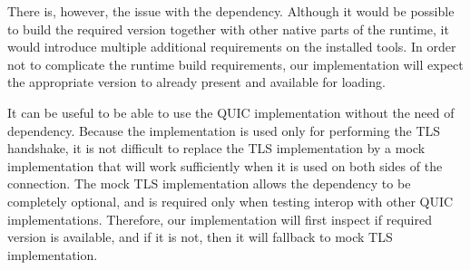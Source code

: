 There is, however, the issue with the \libopenssl{} dependency. Although it would be possible to
build the required \libopenssl{} version together with other native parts of the \dotnet{} runtime,
it would introduce multiple additional requirements on the installed tools. In order not to
complicate the runtime build requirements, our implementation will expect the appropriate
\libopenssl{} version to already present and available for loading.

It can be useful to be able to use the QUIC implementation without the need of \libopenssl{}
dependency. Because the \libopenssl{} implementation is used only for performing the TLS handshake,
it is not difficult to replace the TLS implementation by a mock implementation that will work
sufficiently when it is used on both sides of the connection. The mock TLS implementation allows the
\libopenssl{} dependency to be completely optional, and is required only when testing interop with
other QUIC implementations. Therefore, our implementation will first inspect if required
\libopenssl{} version is available, and if it is not, then it will fallback to mock TLS
implementation.
